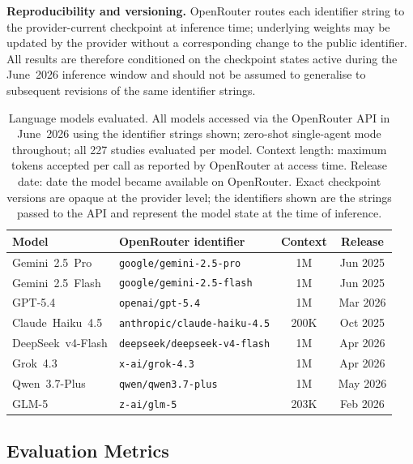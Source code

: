 \documentclass[../main.tex]{subfiles}
\begin{document}
\textbf{Reproducibility and versioning.}
OpenRouter routes each identifier string to the provider-current checkpoint at
inference time; underlying weights may be updated by the provider without a
corresponding change to the public identifier.
All results are therefore conditioned on the checkpoint states active during the
June~2026 inference window and should not be assumed to generalise to subsequent
revisions of the same identifier strings.

\begin{table}[ht]
\centering
\caption{Language models evaluated. All models accessed via the OpenRouter API
in June~2026 using the identifier strings shown; zero-shot single-agent
mode throughout; all 227 studies evaluated per model.
Context length: maximum tokens accepted per call as reported by OpenRouter at
access time.
Release date: date the model became available on OpenRouter.
Exact checkpoint versions are opaque at the provider level; the identifiers
shown are the strings passed to the API and represent the model state at the
time of inference.}
\label{tab:models}
\begin{tabular}{llcc}
\toprule
Model & OpenRouter identifier & Context & Release \\
\midrule
Gemini~2.5~Pro    & \texttt{google/gemini-2.5-pro}          & 1M   & Jun 2025 \\
Gemini~2.5~Flash  & \texttt{google/gemini-2.5-flash}        & 1M   & Jun 2025 \\
GPT-5.4           & \texttt{openai/gpt-5.4}                 & 1M   & Mar 2026 \\
Claude~Haiku~4.5  & \texttt{anthropic/claude-haiku-4.5}     & 200K & Oct 2025 \\
DeepSeek~v4-Flash & \texttt{deepseek/deepseek-v4-flash}     & 1M   & Apr 2026 \\
Grok~4.3          & \texttt{x-ai/grok-4.3}                  & 1M   & Apr 2026 \\
Qwen~3.7-Plus     & \texttt{qwen/qwen3.7-plus}              & 1M   & May 2026 \\
GLM-5             & \texttt{z-ai/glm-5}                     & 203K & Feb 2026 \\
\bottomrule
\end{tabular}
\end{table}

\subsection{Evaluation Metrics}
\label{sec:metrics}
\end{document}

